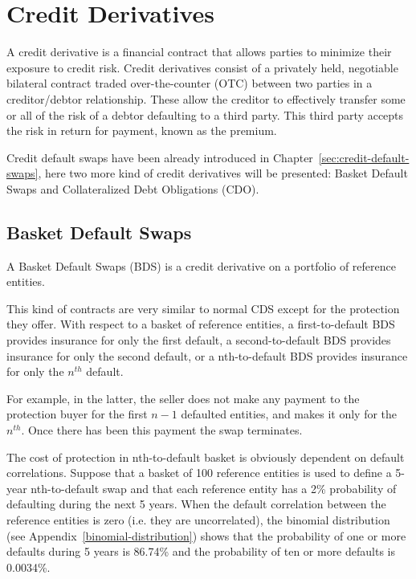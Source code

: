 \chapter{Credit Derivatives}

A credit derivative is a financial contract that allows parties to minimize their exposure to credit risk. Credit derivatives consist of a privately held, negotiable bilateral contract traded over-the-counter (OTC) between two parties in a creditor/debtor relationship. These allow the creditor to effectively transfer some or all of the risk of a debtor defaulting to a third party. This third party accepts the risk in return for payment, known as the premium.

Credit default swaps have been already introduced in Chapter~\ref{sec:credit-default-swaps}, here two more kind of credit derivatives will be presented: Basket Default Swaps and Collateralized Debt Obligations (CDO).

\section{Basket Default Swaps}
\label{basket-default-swaps}

A Basket Default Swaps (BDS) is a credit derivative on a portfolio of reference entities.

This kind of contracts are very similar to normal CDS except for the protection they offer. With respect to a basket of reference entities, a first-to-default BDS provides insurance for only the first default, a second-to-default BDS provides insurance for only the second default, or a nth-to-default BDS provides insurance for only the $n^{th}$ default. 

For example, in the latter, the seller does not make any payment to the protection buyer for the first $n-1$ defaulted entities, and makes it only for the $n^{th}$. Once there has been this payment the swap terminates.

The cost of protection in nth-to-default basket is obviously dependent on default correlations. Suppose that a basket of 100 reference entities is used to define a 5-year nth-to-default swap and that each reference entity has a 2\% probability of defaulting during the next 5 years. When the default correlation between the reference entities is zero (i.e. they are uncorrelated), the binomial distribution (see Appendix~\ref{binomial-distribution}) shows that the probability of one or more defaults during 5 years is 86.74\% and the probability of ten or more defaults is 0.0034\%.

